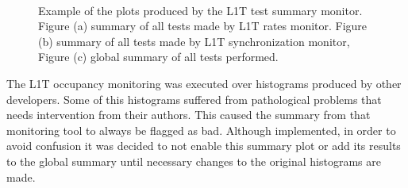 \begin{figure}[!htp]%
\centering
{}\qquad
{}\\
\caption[Example of the plots produced by the \gls{L1T} test summary monitor]{Example of the plots produced by the \gls{L1T} test summary monitor. Figure (a) summary of all tests made by \gls{L1T} rates monitor. Figure (b) summary of all tests made by \gls{L1T} synchronization monitor, Figure (c) global summary of all tests performed.}
\label{FIGURE:TechnicalWork_TestsSummary}
\end{figure}

The \gls{L1T} occupancy monitoring was executed over histograms produced by other developers. Some of this histograms suffered from pathological problems that needs intervention from their authors. This caused the summary from that monitoring tool to always be flagged as bad. Although implemented, in order to avoid confusion it was decided to not enable this summary plot or add its results to the global summary until necessary changes to the original histograms are made.
